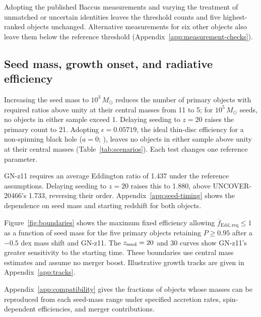 \documentclass[pdflatex,sn-basic]{sn-jnl}
\begin{document}


Adopting the published Baccus measurements and varying the treatment of
unmatched or uncertain identities leaves the threshold counts and five
highest-ranked objects unchanged. Alternative measurements for six other
objects also leave them below the reference threshold
(Appendix~\ref{app:measurement-checks}).


\subsection{Seed mass, growth onset, and radiative efficiency}
\label{sec:growth-scenarios}

Increasing the seed mass to $10^3\,M_\odot$ reduces the number of primary objects
with required ratios above unity at their central masses from 11 to 5; for $10^5\,M_\odot$ seeds, no objects in either sample exceed 1.
Delaying seeding to $z=20$ raises the primary count to 21. Adopting
$\epsilon=0.05719$, the ideal thin-disc efficiency for a non-spinning black hole
($a=0$; \citealt{bardeen1972}), leaves no objects in either sample above unity at their central masses
(Table~\ref{tab:scenarios}). Each test changes one reference parameter.




GN-z11 requires an average Eddington ratio of 1.437 under the reference
assumptions. Delaying seeding to $z=20$ raises this to 1.880, above
UNCOVER-20466's 1.733, reversing their order.
Appendix~\ref{app:seed-timing} shows the dependence on seed mass and
starting redshift for both objects.

Figure~\ref{fig:boundaries} shows the maximum fixed efficiency allowing
$\overline{f}_{\mathrm{Edd,req}}\leq1$ as a function of seed mass for the five
primary objects retaining $P\geq0.95$ after a $-0.5$ dex mass shift and GN-z11.
The $z_{\rm seed}=20$ and 30 curves show GN-z11's greater sensitivity to the starting time.
These boundaries use central mass estimates and assume no merger boost.
Illustrative growth tracks are given in Appendix~\ref{app:tracks}.




Appendix~\ref{app:compatibility} gives the fractions of objects whose masses
can be reproduced from each seed-mass range under specified accretion rates,
spin-dependent efficiencies, and merger contributions.
\end{document}
